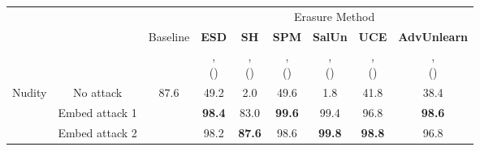 \begin{tabular}{c|c|c|c|c|c|c|c|c}
        \toprule
        &&& \multicolumn{6}{c}{Erasure Method} \\
        \cmidrule(lr){4-9} 
        & & Baseline & \textbf{ESD} &  \textbf{SH} & \textbf{SPM} & \textbf{SalUn} &\textbf{UCE} & \textbf{AdvUnlearn} \\
         &&& 
          \shortstack{\citeauthor{gandikotaErasingConceptsDiffusion2023}, \\ (\citeyear{gandikotaErasingConceptsDiffusion2023})} & 
           \shortstack{\citeauthor{wuScissorhandsScrubData2024}, \\ (\citeyear{wuScissorhandsScrubData2024})} & \shortstack{\citeauthor{lyuOnedimensionalAdapterRule2024}, \\ (\citeyear{lyuOnedimensionalAdapterRule2024})} &
           \shortstack{\citeauthor{fanSalUnEmpoweringMachine2023}, \\ (\citeyear{fanSalUnEmpoweringMachine2023})} &
           \shortstack{\citeauthor{gandikotaUnifiedConceptEditing2023}, \\ (\citeyear{gandikotaUnifiedConceptEditing2023})} &
           \shortstack{\citeauthor{zhangDefensiveUnlearningAdversarial2024}, \\ (\citeyear{zhangDefensiveUnlearningAdversarial2024})}\\
        \midrule
         
         \multirow{3}{*}{Nudity} & No attack & 87.6 &49.2&2.0&49.6&1.8&41.8 & 38.4\\
        & Embed attack 1 && \textbf{98.4} & 83.0 & \textbf{99.6} & 99.4 & 96.8 & \textbf{98.6} \\
        & Embed attack 2 && 98.2 & \textbf{87.6} & 98.6 & \textbf{99.8} & \textbf{98.8} & 96.8 \\
        \bottomrule
    \end{tabular}